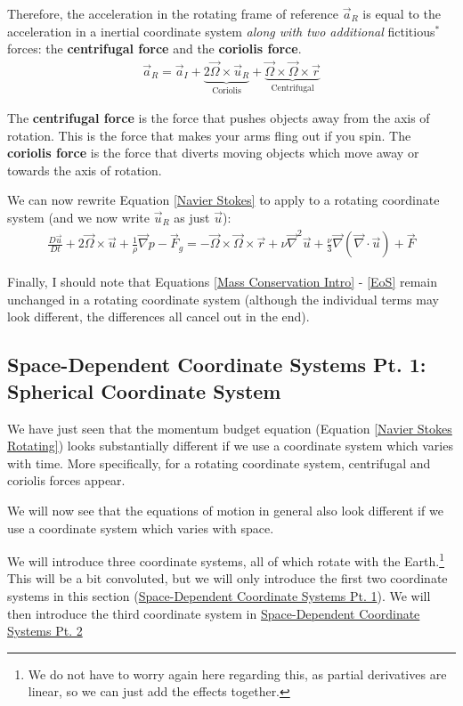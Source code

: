 Therefore, the acceleration in the rotating frame of reference \(\vec{a}_R\) is equal to the acceleration in a inertial coordinate system \textit{along with two additional} fictitious\href{https://xkcd.com/123/}{\(^*\)}  forces: the \textbf{centrifugal force} and the \textbf{coriolis force}.
\begin{align}
   \boxed{\vec{a}_R=\vec{a}_I+\underbrace{2\vec{\Omega}\times\vec{u}_R}_\text{Coriolis}
   +\underbrace{\vec{\Omega}\times\vec{\Omega}\times\vec{r}}_\text{Centrifugal}}
\end{align}

The \textbf{centrifugal force} is the force that pushes objects away from the axis of rotation. This is the force that makes your arms fling out if you spin. The \textbf{coriolis force} is the force that diverts moving objects which move away or towards the axis of rotation. 

We can now rewrite Equation \ref{Navier Stokes} to apply to a rotating coordinate system (and we now write \(\vec{u}_R\) as just \(\vec{u}\)):
\begin{align}
    \frac{D\vec{u}}{Dt}+2\vec{\Omega}\times\vec{u}+\frac{1}{\rho}\vec{\nabla}p-\vec{F}_g=-\vec{\Omega}\times\vec{\Omega}\times\vec{r}+\nu\vec{\nabla}^2\vec{u}+\frac{\nu}{3}\vec{\nabla}(\vec{\nabla}\cdot\vec{u})+\vec{F}\label{Navier Stokes Rotating}
\end{align}

Finally, I should note that Equations \ref{Mass Conservation Intro} - \ref{EoS} remain unchanged in a rotating coordinate system (although the individual terms may look different, the differences all cancel out in the end).

\subsection{Space-Dependent Coordinate Systems Pt. 1: Spherical Coordinate System}\label{s Spherical Coordinates}

We have just seen that the momentum budget equation (Equation \ref{Navier Stokes Rotating}) looks substantially different if we use a coordinate system which varies with time. More specifically, for a rotating coordinate system, centrifugal and coriolis forces appear.

We will now see that the equations of motion in general also look different if we use a coordinate system which varies with space.

We will introduce three coordinate systems, all of which rotate with the Earth.\footnote{We do not have to worry again here regarding this, as partial derivatives are linear, so we can just add the effects together.} This will be a bit convoluted, but we will only introduce the first two coordinate systems in this section (\hyperref[s Spherical Coordinates]{Space-Dependent Coordinate Systems Pt. 1}). We will then introduce the third coordinate system in \hyperref[s Local Cartesian Coordinates]{Space-Dependent Coordinate Systems Pt. 2}

